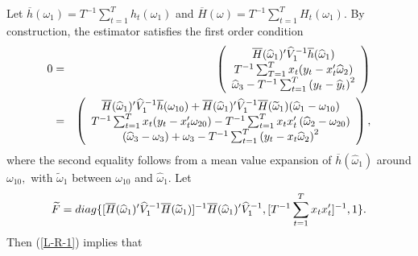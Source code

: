 \documentclass[11pt]{article}
\begin{document}
Let $\overline{h}(\omega _{1})=T^{-1}\sum_{t=1}^{T}h_{t}(\omega _{1})$ and $%
\overline{H}(\omega )=T^{-1}\sum_{t=1}^{T}H_{t}(\omega _{1}).$ By
construction, the estimator satisfies the first order condition%
\begin{eqnarray}
0 &=&\left( 
\begin{array}{c}
\overline{H}(\widehat{\omega }_{1})^{\prime }\widehat{V}_{1}^{-1}\overline{h}%
(\widehat{\omega }_{1}) \\ 
T^{-1}\sum_{T=1}^{T}x_{t}(y_{t}-x_{t}^{\prime }\widehat{\omega }_{2}) \\ 
\widehat{\omega }_{3}-T^{-1}\sum_{t=1}^{T}\left( y_{t}-\widehat{y}%
_{t}\right) ^{2}%
\end{array}%
\right)   \notag \\
&=&\left( 
\begin{array}{c}
\overline{H}(\widehat{\omega }_{1})^{\prime }\widehat{V}_{1}^{-1}\overline{h}%
(\omega _{10})+\overline{H}(\widehat{\omega }_{1})^{\prime }\widehat{V}%
_{1}^{-1}\overline{H}(\widetilde{\omega }_{1})(\widehat{\omega }_{1}-\omega
_{10}) \\ 
T^{-1}\sum_{t=1}^{T}x_{t}(y_{t}-x_{t}^{\prime }\omega
_{20})-T^{-1}\sum_{t=1}^{T}x_{t}x_{t}^{\prime }\left( \widehat{\omega }%
_{2}-\omega _{20}\right)  \\ 
\left( \widehat{\omega }_{3}-\omega _{3}\right) +\omega
_{3}-T^{-1}\sum_{t=1}^{T}\left( y_{t}-x_{t}\widehat{\omega }_{2}\right) ^{2}%
\end{array}%
\right) ,  \label{L-R-1}
\end{eqnarray}%
where the second equality follows from a mean value expansion of $\overline{h%
}(\widehat{\omega }_{1})$ around $\omega _{10},$ with $\widetilde{\omega }%
_{1}$ between $\omega _{10}$ and $\widehat{\omega }_{1}$. Let%
\begin{equation}
\widetilde{F}=diag\{[\overline{H}(\widehat{\omega }_{1})^{\prime }\widehat{V}%
_{1}^{-1}\overline{H}(\widetilde{\omega }_{1})]^{-1}\overline{H}(\widehat{%
\omega }_{1})^{\prime }\widehat{V}_{1}^{-1},[T^{-1}%
\sum_{t=1}^{T}x_{t}x_{t}^{\prime }]^{-1},1\}.
\end{equation}%
Then (\ref{L-R-1}) implies that 
\end{document}
